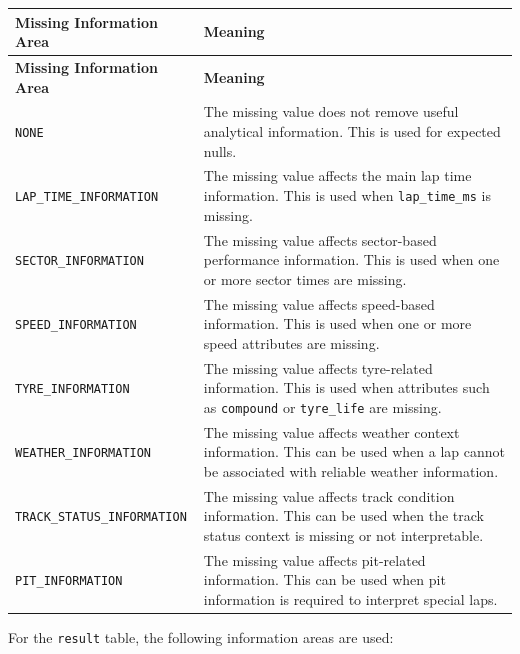 \documentclass[a4paper,11pt]{article}
\begin{document}
	\begin{longtable}{p{5cm}p{9.5cm}}
		\toprule
		\textbf{Missing Information Area} & \textbf{Meaning} \\
		\midrule
		\endfirsthead
		
		\toprule
		\textbf{Missing Information Area} & \textbf{Meaning} \\
		\midrule
		\endhead
		
		\texttt{NONE}
		& The missing value does not remove useful analytical information. This is used for expected nulls. \\
		\midrule
		
		\texttt{LAP\_TIME\_INFORMATION}
		& The missing value affects the main lap time information. This is used when \texttt{lap\_time\_ms} is missing. \\
		\midrule
		
		\texttt{SECTOR\_INFORMATION}
		& The missing value affects sector-based performance information. This is used when one or more sector times are missing. \\
		\midrule
		
		\texttt{SPEED\_INFORMATION}
		& The missing value affects speed-based information. This is used when one or more speed attributes are missing. \\
		\midrule
		
		\texttt{TYRE\_INFORMATION}
		& The missing value affects tyre-related information. This is used when attributes such as \texttt{compound} or \texttt{tyre\_life} are missing. \\
		\midrule
		
		\texttt{WEATHER\_INFORMATION}
		& The missing value affects weather context information. This can be used when a lap cannot be associated with reliable weather information. \\
		\midrule
		
		\texttt{TRACK\_STATUS\_INFORMATION}
		& The missing value affects track condition information. This can be used when the track status context is missing or not interpretable. \\
		\midrule
		
		\texttt{PIT\_INFORMATION}
		& The missing value affects pit-related information. This can be used when pit information is required to interpret special laps. \\

		\bottomrule
	\end{longtable}
	
	For the \texttt{result} table, the following information areas are used:
	
\end{document}
